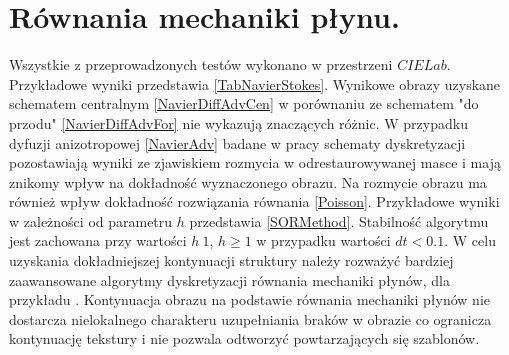 \documentclass[12pt, twoside, openany]{report}
\theoremstyle{definition}
\begin{document}
\section{Równania mechaniki płynu.}
Wszystkie z przeprowadzonych testów wykonano w przestrzeni $CIELab$. Przykładowe wyniki  przedstawia \autoref{TabNavierStokes}. Wynikowe obrazy uzyskane schematem centralnym \eqref{NavierDiffAdvCen} w porównaniu ze schematem "do przodu" \eqref{NavierDiffAdvFor} nie wykazują znaczących różnic. W przypadku dyfuzji anizotropowej \eqref{NavierAdv}  badane w pracy  schematy dyskretyzacji pozostawiają wyniki ze zjawiskiem rozmycia w odrestaurowywanej masce i mają znikomy wpływ na dokładność wyznaczonego obrazu. Na rozmycie obrazu ma również wpływ dokładność rozwiązania równania \eqref{Poisson}. Przykładowe wyniki w zależności od parametru $h$  przedstawia \autoref{SORMethod}. Stabilność algorytmu jest zachowana przy wartości $h~1$, $h \geq1$ w przypadku wartości $dt <0.1$. W celu uzyskania dokładniejszej kontynuacji struktury należy rozważyć bardziej zaawansowane algorytmy dyskretyzacji równania mechaniki płynów, dla przykładu \cite{tschumperle2006fast}. Kontynuacja obrazu na podstawie równania mechaniki płynów nie dostarcza nielokalnego charakteru uzupełniania braków w obrazie co ogranicza kontynuację tekstury i nie pozwala odtworzyć powtarzających się szablonów.
\end{document}

